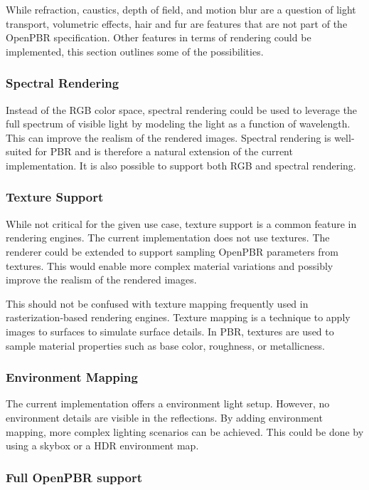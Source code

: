 While refraction, caustics, depth of field, and motion blur are a question of light transport, volumetric effects, hair and fur are features that are not part of the \gls{OpenPBR} specification. Other features in terms of rendering could be implemented, this section outlines some of the possibilities.

\subsubsection*{Spectral Rendering}

Instead of the \gls{RGB} color space, spectral rendering could be used to leverage the full spectrum of visible light by modeling the light as a function of wavelength. This can improve the realism of the rendered images. Spectral rendering is well-suited for \gls{PBR} and is therefore a natural extension of the current implementation. It is also possible to support both \gls{RGB} and spectral rendering.

\subsubsection*{Texture Support}

While not critical for the given use case, texture support is a common feature in rendering engines. The current implementation does not use textures. The renderer could be extended to support sampling \gls{OpenPBR} parameters from textures. This would enable more complex material variations and possibly improve the realism of the rendered images.

This should not be confused with texture mapping frequently used in rasterization-based rendering engines. Texture mapping is a technique to apply images to surfaces to simulate surface details. In \gls{PBR}, textures are used to sample material properties such as base color, roughness, or metallicness.

\subsubsection*{Environment Mapping}

The current implementation offers a environment light setup. However, no environment details are visible in the reflections. By adding environment mapping, more complex lighting scenarios can be achieved. This could be done by using a skybox or a \gls{HDR} environment map.

\subsubsection*{Full OpenPBR support}

